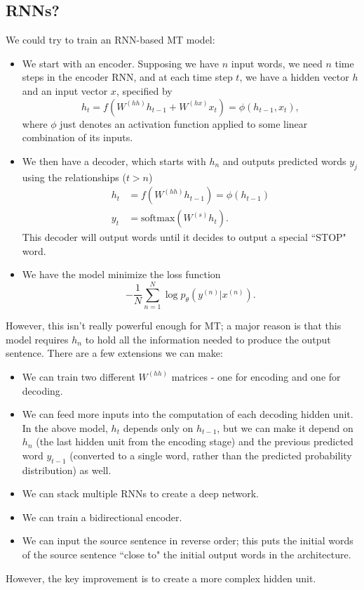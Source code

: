 \subsection{RNNs?}
We could try to train an RNN-based MT model:
\begin{itemize}
\item We start with an encoder. Supposing we have $n$ input words, we need $n$ time steps in the encoder RNN, and at each time step $t$, we have a hidden vector $h$ and an input vector $x$, specified by
$$h_t = f\left(W^{(hh)}h_{t-1} + W^{(hx)}x_t\right) = \phi(h_{t-1}, x_t),$$
where $\phi$ just denotes an activation function applied to some linear combination of its inputs.
\item We then have a decoder, which starts with $h_n$ and outputs predicted words $y_j$ using the relationships ($t > n$)
\begin{align*}
h_t &= f(W^{(hh)}h_{t-1}) = \phi(h_{t-1})\\
y_t &= \text{softmax}(W^{(s)}h_t).
\end{align*}
This decoder will output words until it decides to output a special ``STOP" word.
\item We have the model minimize the loss function
$$-\frac{1}{N} \sum_{n=1}^N \log p_\theta(y^{(n)} | x^{(n)}).$$
\end{itemize}
However, this isn't really powerful enough for MT; a major reason is that this model requires $h_n$ to hold all the information needed to produce the output sentence. There are a few extensions we can make:
\begin{itemize}
\item We can train two different $W^{(hh)}$ matrices - one for encoding and one for decoding.
\item We can feed more inputs into the computation of each decoding hidden unit. In the above model, $h_t$ depends only on $h_{t-1}$, but we can make it depend on $h_n$ (the last hidden unit from the encoding stage) and the previous predicted word $y_{t-1}$ (converted to a single word, rather than the predicted probability distribution) as well.
\item We can stack multiple RNNs to create a deep network.
\item We can train a bidirectional encoder.
\item We can input the source sentence in reverse order; this puts the initial words of the source sentence ``close to" the initial output words in the architecture.
\end{itemize}
However, the key improvement is to create a more complex hidden unit.


